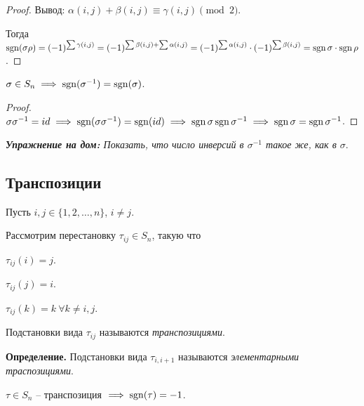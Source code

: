 \begin{proof}
    Вывод: $ \alpha(i, j) + \beta(i, j) \equiv \gamma(i,j) \pmod{2}$.

    \bigskip
    Тогда $\operatorname{\mathop{\mathrm{sgn}}}(\sigma \rho) = (-1)^{\sum \gamma(i,j)} = (-1)^{\sum \beta(i,j) + \sum \alpha(i,j)} = (-1)^{\sum \alpha(i,j)} \cdot (-1)^{\sum \beta(i,j)} = \operatorname{\mathop{\mathrm{sgn}}} \sigma \cdot \operatorname{\mathop{\mathrm{sgn}}} \rho$.
\end{proof}

\begin{corollary}
    $\sigma \in S_n \implies \operatorname{\mathop{\mathrm{sgn}}} (\sigma^{-1}) = \operatorname{\mathop{\mathrm{sgn}}}(\sigma)$.
\end{corollary}

\begin{proof}
    $\sigma \sigma^{-1} = id \implies \operatorname{\mathop{\mathrm{sgn}}}(\sigma \sigma^{-1}) = \operatorname{\mathop{\mathrm{sgn}}}(id) \implies \operatorname{\mathop{\mathrm{sgn}}} \sigma \operatorname{\mathop{\mathrm{sgn}}} \sigma^{-1} \implies \operatorname{\mathop{\mathrm{sgn}}} \sigma = \operatorname{\mathop{\mathrm{sgn}}} \sigma^{-1}$.
\end{proof}

\textit{\textbf{Упражнение на дом:} Показать, что число инверсий в $\sigma^{-1}$ такое же, как в $\sigma$}.

\subsection{Транспозиции}

Пусть $i, j \in \{1, 2, \dots, n\}$, $i \neq j$.

Рассмотрим перестановку $\tau_{ij} \in S_n$, такую что

$\tau_{ij}(i) = j$.

$\tau_{ij}(j) = i$.

$\tau_{ij}(k) = k \ \forall k \neq i, j$.

\begin{definition}
    Подстановки вида $\tau_{ij}$ называются \textit{транспозициями}.
\end{definition}

\begin{comment}
    $\tau$ -- траспозиция $\implies \tau^2 = id, \tau^{-1} = \tau$.
\end{comment}

\bigskip
\textbf{Определение.} Подстановки вида $\tau_{i, i+1}$ называются \textit{элементарными траспозициями}.

\begin{lemma}
    $\tau \in S_n$ -- транспозиция $\implies \operatorname{\mathop{\mathrm{sgn}}}(\tau) = -1$.
\end{lemma}

